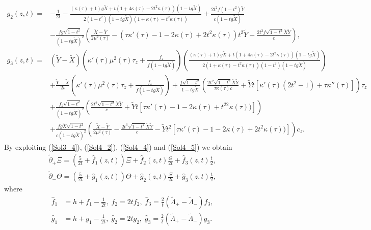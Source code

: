 \documentclass[3p,11pt]{elsarticle}
\numberwithin{equation}{section}
\begin{document}
\begin{equation*}
\begin{split}
         g_2(z,t)=&-\frac{1}{2t}-\frac{(\kappa(\tau)+1)g\widetilde X+t(1+4\kappa(\tau)-2t^2\kappa(\tau))(1-tg\widetilde X)}{2(1-t^2)(1-tg\widetilde X)(1+\kappa(\tau)-t^2\kappa(\tau))}+\frac{2t^2f(1-t^2)\widetilde Y}{c(1-tg\widetilde X)}\\ 
         &-\frac{fg\sqrt{1-t^2}}{(1-tg\widetilde X)^2}\left(\frac{\widetilde X-\widetilde Y}{2\mu^2(\tau)}-(\tau\kappa'(\tau)-1-2\kappa(\tau)+2t^2\kappa(\tau))t^2\widetilde Y-\frac{2t^3f\sqrt{1-t^2}\widetilde X\widetilde Y}{c} \right),\\
        g_3(z,t)=& (\widetilde Y-\widetilde X)\left(\kappa'(\tau)\mu^2(\tau)\tau_z+\frac{f_z}{f(1-tg\widetilde X)} \right)\left( \frac{(\kappa(\tau)+1)g\widetilde X+t(1+4\kappa(\tau)-2t^2\kappa(\tau))(1-tg\widetilde X)}{2(1+\kappa(\tau)-t^2\kappa(\tau))(1-t^2)(1-tg\widetilde X)}\right)\\ 
         &+ \frac{\widetilde Y-\widetilde X}{2t}\left(\kappa'(\tau)\mu^2(\tau)\tau_z+\frac{f_z}{f(1-tg\widetilde X)} \right)+\frac{f\sqrt{1-t^2}}{1-tg\widetilde X}\left(\frac{2t^2\sqrt{1-t^2}\widetilde X\widetilde Y}{\tau\kappa(\tau)c}+\widetilde Y t[\kappa'(\tau)(2t^2-1)+\tau\kappa''(\tau)]\right)\tau_z\\
         &+\frac{f_z\sqrt{1-t^2}}{(1-tg\widetilde X)^2}\left(\frac{2t^2\sqrt{1-t^2}\widetilde X\widetilde Y}{c}+\widetilde Y t[\tau\kappa'(\tau)-1-2\kappa(\tau)+t^22\kappa(\tau))]\right) \\
         &+ \frac{fg\widetilde X\sqrt{1-t^2}}{c(1-tg\widetilde X)^2}\left(\frac{\widetilde X-\widetilde Y}{2\mu^2(\tau)}-\frac{2t^3\sqrt{1-t^2}\widetilde X\widetilde Y}{c}-\widetilde Y t^2[\tau\kappa'(\tau)-1-2\kappa(\tau)+2t^2\kappa(\tau))]\right)c_z.
    \end{split}
\end{equation*}
By exploiting (\ref{Sol3_4}), (\ref{Sol4_2}), (\ref{Sol4_4}) and (\ref{Sol4_5}) we obtain
\begin{equation}\label{Sol4_8}
    \begin{split}
        \tilde\partial_+\Xi =\left(\frac{5}{2t}+\hat f_1(z,t)\right)\Xi+\hat f_2(z,t)\frac{\Theta}{2t}+\hat f_3(z,t)\frac{t}{2},\\
        \tilde\partial_-\Theta =\left(\frac{5}{2t}+\hat g_1(z,t)\right)\Theta+\hat g_2(z,t)\frac{\Xi}{2t}+\hat g_3(z,t)\frac{t}{2},
    \end{split}
\end{equation}
where
\begin{equation*}\label{Sol4_9}
    \begin{split}
        \hat f_1&=h+f_1-\frac{1}{2t}, \; \hat f_2=2tf_2, \; \hat f_3=\frac{2}{t}(\tilde\Lambda_+ -\tilde\Lambda_-)f_3,\\
        \hat g_1&=h+g_1-\frac{1}{2t} , \; \hat g_2=2tg_2, \; \hat g_3=\frac{2}{t}(\tilde\Lambda_+ -\tilde\Lambda_-)g_3.
    \end{split}
\end{equation*}
\end{document}
